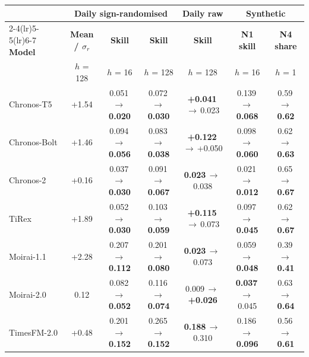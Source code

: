 \begin{tabular}{@{}lcccccc@{}}
\toprule
 & \multicolumn{3}{c}{\textbf{Daily sign-randomised}} & \multicolumn{1}{c}{\textbf{Daily raw}} & \multicolumn{2}{c}{\textbf{Synthetic}} \\
\cmidrule(lr){2-4}\cmidrule(lr){5-5}\cmidrule(lr){6-7}
\textbf{Model} & \textbf{Mean / $\sigma_r$} & \textbf{Skill} & \textbf{Skill} & \textbf{Skill} & \textbf{N1 skill} & \textbf{N4 share} \\
 & $h$ = 128 & $h$ = 16 & $h$ = 128 & $h$ = 128 & $h$ = 16 & $h$ = 1 \\
\midrule
Chronos-T5 & +1.54 & \textminus{}0.051\,$\to$\,\textbf{\textminus{}0.020} & \textminus{}0.072\,$\to$\,\textbf{\textminus{}0.030} & \textbf{+0.041}\,$\to$\,\textminus{}0.023 & \textminus{}0.139\,$\to$\,\textbf{\textminus{}0.068} & 0.59\,$\to$\,\textbf{0.62} \\
Chronos-Bolt & +1.46 & \textminus{}0.094\,$\to$\,\textbf{\textminus{}0.056} & \textminus{}0.083\,$\to$\,\textbf{\textminus{}0.038} & \textbf{+0.122}\,$\to$\,+0.050 & \textminus{}0.098\,$\to$\,\textbf{\textminus{}0.060} & 0.62\,$\to$\,\textbf{0.63} \\
Chronos-2 & +0.16 & \textminus{}0.037\,$\to$\,\textbf{\textminus{}0.030} & \textminus{}0.091\,$\to$\,\textbf{\textminus{}0.067} & \textbf{\textminus{}0.023}\,$\to$\,\textminus{}0.038 & \textminus{}0.021\,$\to$\,\textbf{\textminus{}0.012} & 0.65\,$\to$\,\textbf{0.67} \\
TiRex & +1.89 & \textminus{}0.052\,$\to$\,\textbf{\textminus{}0.030} & \textminus{}0.103\,$\to$\,\textbf{\textminus{}0.059} & \textbf{+0.115}\,$\to$\,\textminus{}0.073 & \textminus{}0.097\,$\to$\,\textbf{\textminus{}0.045} & 0.62\,$\to$\,\textbf{0.67} \\
Moirai-1.1 & +2.28 & \textminus{}0.207\,$\to$\,\textbf{\textminus{}0.112} & \textminus{}0.201\,$\to$\,\textbf{\textminus{}0.080} & \textbf{\textminus{}0.023}\,$\to$\,\textminus{}0.073 & \textminus{}0.059\,$\to$\,\textbf{\textminus{}0.048} & 0.39\,$\to$\,\textbf{0.41} \\
Moirai-2.0 & \textminus{}0.12 & \textminus{}0.082\,$\to$\,\textbf{\textminus{}0.052} & \textminus{}0.116\,$\to$\,\textbf{\textminus{}0.074} & \textminus{}0.009\,$\to$\,\textbf{+0.026} & \textbf{\textminus{}0.037}\,$\to$\,\textminus{}0.045 & 0.63\,$\to$\,\textbf{0.64} \\
TimesFM-2.0 & +0.48 & \textminus{}0.201\,$\to$\,\textbf{\textminus{}0.152} & \textminus{}0.265\,$\to$\,\textbf{\textminus{}0.152} & \textbf{\textminus{}0.188}\,$\to$\,\textminus{}0.310 & \textminus{}0.186\,$\to$\,\textbf{\textminus{}0.096} & 0.56\,$\to$\,\textbf{0.61} \\

\end{tabular}
